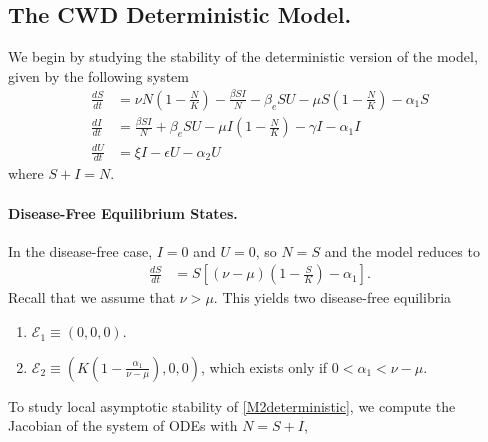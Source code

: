 \documentclass[12pt,a4paper,reqno]{amsart}
\theoremstyle{definition}
\theoremstyle{remark}
\theoremstyle{plain}
\begin{document}
\subsection{The CWD Deterministic Model.} We begin by studying the stability of the deterministic version of the model, given by the following system
\begin{align}\label{M2deterministic}
\frac{dS}{dt} &= \nu N\left(1-\frac{N}{K}\right) - \frac{\beta S I}{N} - \beta_e S U - \mu S\left(1-\frac{N}{K}\right) - \alpha_1 S  \nonumber\\
\frac{dI}{dt} &= \frac{\beta S I}{N} + \beta_e S U - \mu I\left(1-\frac{N}{K}\right) - \gamma I - \alpha_1 I \\
\frac{dU}{dt} &= \xi I - \epsilon U - \alpha_2 U   \nonumber
\end{align}
where $S+I=N$.

\paragraph*{\textbf{Disease-Free Equilibrium States.}}

In the disease-free case, $I=0$ and $U=0$, so $N=S$ and the model reduces to
\begin{align}\label{population}
\frac{dS}{dt}&=S\left[(\nu-\mu)\left(1-\frac{S}{K}\right)-\alpha_1\right].
\end{align}
Recall that we assume that $\nu>\mu$. This yields two disease-free equilibria
\begin{enumerate}
    \item $\mathcal{E}_{1}\equiv(0,0,0)$.
    \item $\mathcal{E}_2\equiv\left(K\left(1-\frac{\alpha_1}{\nu-\mu}\right),0,0\right)$, which exists only if $0<\alpha_1<\nu-\mu$.
\end{enumerate}

To study local asymptotic stability of \eqref{M2deterministic}, we compute the Jacobian of the system of ODEs with $N=S+I$,
\end{document}
